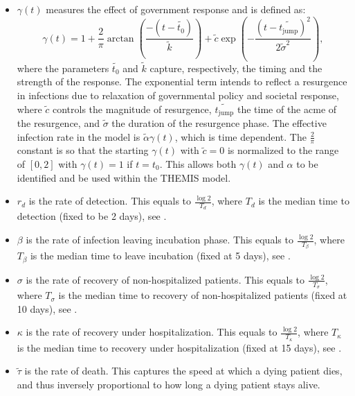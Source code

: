\documentclass[msom,blindrev]{informs3} %
\begin{document}
\begin{APPENDICES}
\begin{itemize}[topsep=0pt,itemsep=0pt]
    \item $\gamma(t)$ measures the effect of government response and is defined as:
    \[\gamma(t)=1 + \frac{2}{\pi}\arctan\left(\frac{-(t-\widetilde{t_0})}{\widetilde{k}}\right) + \widetilde{c}\exp\left(-\frac{(t-\widetilde{t_\text{jump}})^2}{2\widetilde{\sigma}^2}\right), \]
    where the parameters $\widetilde{t_0}$ and $\widetilde{k}$ capture, respectively, the timing and the strength of the response. The exponential term intends to reflect a resurgence in infections due to relaxation of governmental policy and societal response, where $\widetilde{c}$ controls the magnitude of resurgence, $\widetilde{t_\text{jump}}$ the time of the acme of the resurgence, and $\widetilde{\sigma}$ the duration of the resurgence phase.  The effective infection rate in the model is $\widetilde{\alpha}\gamma(t)$, which is time dependent. The $\frac{2}{\pi}$ constant is so that the starting $\gamma(t)$ with $\widetilde{c}=0$ is normalized to the range of $[0,2]$ with $\gamma(t)=1$ if $t=t_0$. This allows both $\gamma(t)$ and $\alpha$ to be identified and be used within the THEMIS model. 
    \item $r_d$ is the rate of detection. This equals to $\frac{\log 2}{T_{d}}$, where $T_{d}$ is the median time to detection (fixed to be 2 days), see  .
    \item $\beta$ is the rate of infection leaving incubation phase. This equals to $\frac{\log 2}{T_{\beta}}$, where $T_{\beta}$ is the median time to leave incubation (fixed at 5 days), see  .
    \item $\sigma$ is the rate of recovery of non-hospitalized patients. This equals to $\frac{\log 2}{T_{\sigma}}$, where $T_{\sigma}$ is the median time to recovery of non-hospitalized patients  (fixed at 10 days), see .
    \item $\kappa$ is the rate of recovery under hospitalization.  This equals to $\frac{\log 2}{T_{\kappa}}$, where $T_{\kappa}$ is the median time to recovery under hospitalization (fixed at 15 days), see .
    \item $\widetilde{\tau}$ is the rate of death. This captures the speed at which a dying patient dies, and thus inversely proportional to how long a dying patient stays alive.


\end{itemize}
\end{APPENDICES}
\end{document}
